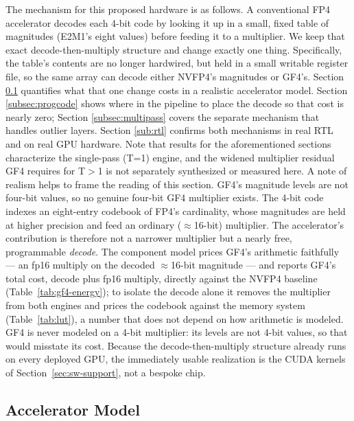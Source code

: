 The mechanism for this proposed hardware is as follows. A conventional FP4
accelerator decodes each 4-bit code by looking it up in a small, fixed table of
magnitudes (E2M1's eight values) before feeding it to a multiplier. We keep that
exact decode-then-multiply structure and change exactly one thing.
Specifically, the table's contents are no longer hardwired, but held in a small
writable register file, so the same array can decode either NVFP4's magnitudes
or GF4's. Section \ref{subsec:acc} quantifies what that one change costs in a
realistic accelerator model. Section \ref{subsec:progcode} shows where in the
pipeline to place the decode so that cost is nearly zero; Section
\ref{subsec:multipass} covers the separate mechanism that handles outlier
layers. Section \ref{sub:rtl} confirms both mechanisms in real RTL and on real
GPU hardware. Note that results for the aforementioned sections characterize the
single-pass (T=1) engine, and the widened multiplier residual GF4 requires for
T$>$1 is not separately synthesized or measured here. A note of realism helps to
frame the reading of this section. GF4's magnitude levels are not four-bit
values, so no genuine four-bit GF4 multiplier exists. The 4-bit code indexes an
eight-entry codebook of FP4's cardinality, whose magnitudes are held at higher
precision and feed an ordinary ($\approx$16-bit) multiplier. The accelerator's
contribution is therefore not a narrower multiplier but a nearly free,
programmable \emph{decode}. The component model prices GF4's arithmetic
faithfully --- an fp16 multiply on the decoded $\approx$16-bit magnitude --- and
reports GF4's total cost, decode plus fp16 multiply, directly against the NVFP4
baseline (Table~\ref{tab:gf4-energy}); to isolate the decode alone it removes the
multiplier from both engines and prices the codebook against the memory system
(Table~\ref{tab:lut}), a number that does not depend on how arithmetic is
modeled. GF4 is never modeled on a 4-bit multiplier: its levels are not 4-bit
values, so that would misstate its cost. Because the decode-then-multiply
structure already runs on every deployed GPU, the immediately usable realization
is the CUDA kernels of Section~\ref{sec:sw-support}, not a bespoke chip.


\subsection{Accelerator Model}\label{subsec:acc}

